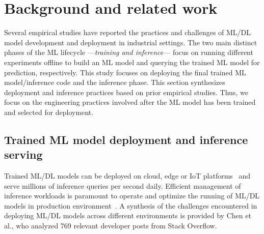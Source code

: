 \section{Background and related work}
\label{sec: background and related work}

Several empirical studies have reported the practices and challenges of ML/DL model development and deployment in industrial settings. The two main distinct phases of the ML lifecycle ---\textit{training and inference}--- focus on running different experiments offline to build an ML model and querying the trained ML model for prediction, respectively. This study focuses on deploying the final trained ML model/inference code and the inference phase. This section synthesizes deployment and inference practices based on prior empirical studies. Thus, we focus on the engineering practices involved after the ML model has been trained and selected for deployment.

\subsection{Trained ML model deployment and inference serving}
\label{subsec: trained ML model deployment}
Trained ML/DL models can be deployed on cloud, edge or IoT platforms~\cite{Hazelwood-FB, Wu-FB-edge} and serve millions of inference queries per second daily. Efficient management of inference workloads is paramount to operate and optimize the running of ML/DL models in production environment~\cite{Park, Boroumand}. A synthesis of the challenges encountered in deploying ML/DL models across different environments is provided by Chen et al.\cite{Chen}, who analyzed 769 relevant developer posts from Stack Overflow.


